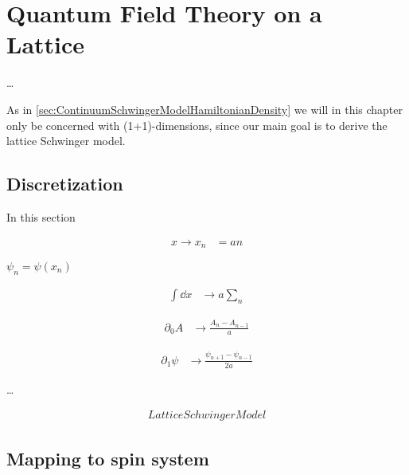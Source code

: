 \documentclass[../main.tex]{subfiles} %
\begin{document}
\chapter{Quantum Field Theory on a Lattice} \label{chap:LatticeQFT}

\ldots

As in \cref{sec:ContinuumSchwingerModelHamiltonianDensity} we will in this chapter only be concerned with (1+1)-dimensions, since our main goal is to derive the lattice Schwinger model.




\section{Discretization}

In this section

\begin{align}
    x \rightarrow x_n &= an
\end{align}

$\psi_n = \psi(x_n)$

\begin{align}
    \int \dd{x} &\rightarrow a \sum_n
\end{align}

\begin{align}
    \partial_0 A &\rightarrow \frac{A_n - A_{n-\hat{1}}}{a}
\end{align}

\begin{align}
    \partial_1 \psi &\rightarrow \frac{\psi_{n+\hat{1}} - \psi_{n-\hat{1}}}{2a}
\end{align}




\ldots

\begin{align} \label{eq:LatticeSchwingerModelHamiltonian}
    LatticeSchwingerModel
\end{align}



\section{Mapping to spin system}
\end{document}

